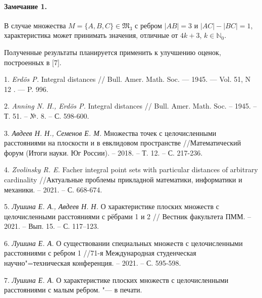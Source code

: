 \paragraph{Замечание 1.}
В случае множества $M=\{A, B, C\} \in \mathfrak{M}_{3}$ с ребром $|AB|=3$ и $|AC|-|BC|=1$, характеристика может принимать значения, отличные от $4k+3$, $k\in\mathbb{N}_{0}$.

Полученные результаты планируется применить к улучшению оценок, построенных в [7].

\litlist

1. {\it Erdös P.}
Integral distances // Bull. Amer. Math. Soc. — 1945. — Vol. 51, N 12 . — P. 996.

2. {\it Anning N. H., Erdös P. }
Integral distances // Bull. Amer. Math. Soc. – 1945. – Т. 51. – №. 8. – С. 598-600.

3. {\it Авдеев Н. Н., Семенов Е. М.}
Множества точек с целочисленными расстояниями на плоскости и в евклидовом пространстве //Математический форум (Итоги науки. Юг России). – 2018. – Т. 12. – С. 217-236.

4. \foreignlanguage{english}{{\it Zvolinsky R. E.}
Facher integral point sets with particular distances of arbitrary cardinality} //Актуальные проблемы прикладной математики, информатики и механики. – 2021. – С. 668-674.

5. {\it Лушина Е. А., Авдеев Н. Н.}
О характеристике плоских множеств с целочисленными
расстояниями с рёбрами 1 и 2 // Вестник факультета ПММ. – 2021. – Вып. 15. – С.
117–123.

6. {\it Лушина Е. А.}
О существовании специальных множеств с целочисленными расстояниями с ребром 1 //71-я Международная студенческая научно"=техническая конференция. – 2021. – С. 595-598.

7. {\it Лушина Е. А.}
О характеристике плоских множеств с целочисленными расстояниями с малым ребром. "--- в печати.



